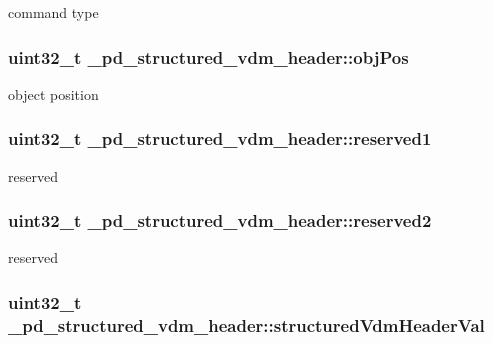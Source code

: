 command type \hypertarget{struct__pd__structured__vdm__header_a70c79769097f532657064784a5803022}{
\subsubsection[{obj\-Pos}]{\setlength{\rightskip}{0pt plus 5cm}uint32\-\_\-t \-\_\-pd\-\_\-structured\-\_\-vdm\-\_\-header\-::obj\-Pos}}\label{struct__pd__structured__vdm__header_a70c79769097f532657064784a5803022}
object position \hypertarget{struct__pd__structured__vdm__header_ae96832372241f43fdbb0a364539d424f}{
\subsubsection[{reserved1}]{\setlength{\rightskip}{0pt plus 5cm}uint32\-\_\-t \-\_\-pd\-\_\-structured\-\_\-vdm\-\_\-header\-::reserved1}}\label{struct__pd__structured__vdm__header_ae96832372241f43fdbb0a364539d424f}
reserved \hypertarget{struct__pd__structured__vdm__header_aced9840a12b97bb0e0acc6e4d72a3566}{
\subsubsection[{reserved2}]{\setlength{\rightskip}{0pt plus 5cm}uint32\-\_\-t \-\_\-pd\-\_\-structured\-\_\-vdm\-\_\-header\-::reserved2}}\label{struct__pd__structured__vdm__header_aced9840a12b97bb0e0acc6e4d72a3566}
reserved \hypertarget{struct__pd__structured__vdm__header_a0544fc4b30468ec5d5b435a05b30ced1}{
\subsubsection[{structured\-Vdm\-Header\-Val}]{\setlength{\rightskip}{0pt plus 5cm}uint32\-\_\-t \-\_\-pd\-\_\-structured\-\_\-vdm\-\_\-header\-::structured\-Vdm\-Header\-Val}}\label{struct__pd__structured__vdm__header_a0544fc4b30468ec5d5b435a05b30ced1}
